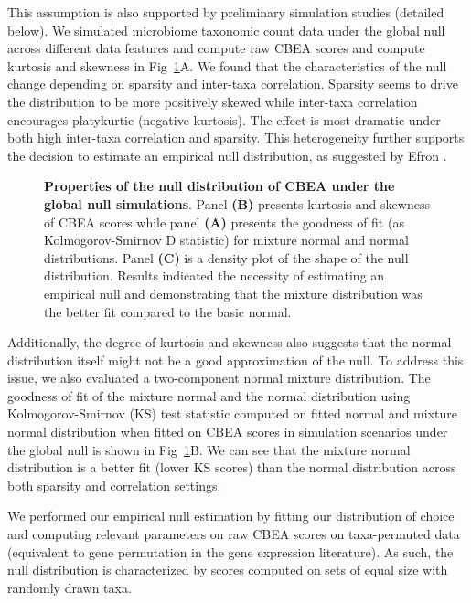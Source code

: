 This assumption is also supported by preliminary simulation studies (detailed below). We simulated microbiome taxonomic count data under the global null across different data features and compute raw CBEA scores and compute kurtosis and skewness in Fig~\ref{fig:1}A. We found that the characteristics of the null change depending on sparsity and inter-taxa correlation. Sparsity seems to drive the distribution to be more positively skewed while inter-taxa correlation encourages platykurtic (negative kurtosis). The effect is most dramatic under both high inter-taxa correlation and sparsity. This heterogeneity further supports the decision to estimate an empirical null distribution, as suggested by Efron \cite{efron2004}. 

\begin{figure} [!h]
    \centering
    \caption{{\bf Properties of the null distribution of CBEA under the global null simulations}. Panel \textbf{(B)} presents kurtosis and skewness of CBEA scores while panel \textbf{(A)} presents the goodness of fit (as Kolmogorov-Smirnov D statistic) for mixture normal and normal distributions. Panel \textbf{(C)} is a density plot of the shape of the null distribution. Results indicated the necessity of estimating an empirical null and demonstrating that the mixture distribution was the better fit compared to the basic normal.}
    \label{fig:1}
\end{figure}

Additionally, the degree of kurtosis and skewness also suggests that the normal distribution itself might not be a good approximation of the null. To address this issue, we also evaluated a two-component normal mixture distribution. The goodness of fit of the mixture normal and the normal distribution using Kolmogorov-Smirnov (KS) test statistic computed on fitted normal and mixture normal distribution when fitted on CBEA scores in simulation scenarios under the global null is shown in Fig~\ref{fig:1}B. We can see that the mixture normal distribution is a better fit (lower KS scores) than the normal distribution across both sparsity and correlation settings. 

We performed our empirical null estimation by fitting our distribution of choice and computing relevant parameters on raw CBEA scores on taxa-permuted data (equivalent to gene permutation in the gene expression literature). As such, the null distribution is characterized by scores computed on sets of equal size with randomly drawn taxa. 

